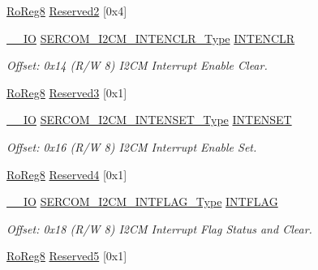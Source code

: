 \begin{DoxyCompactItemize}
\mbox{\hyperlink{group___s_a_m_d21_e15_a__definitions_ga0d957f1433aaf5d70e4dc2b68288442d}{Ro\+Reg8}} \mbox{\hyperlink{struct_sercom_i2cm_a78f3c89e13bd565a077e9418f43aaa04}{Reserved2}} \mbox{[}0x4\mbox{]}
\item 
\mbox{\hyperlink{core__cm0plus_8h_aec43007d9998a0a0e01faede4133d6be}{\+\_\+\+\_\+\+IO}} \mbox{\hyperlink{union_s_e_r_c_o_m___i2_c_m___i_n_t_e_n_c_l_r___type}{S\+E\+R\+C\+O\+M\+\_\+\+I2\+C\+M\+\_\+\+I\+N\+T\+E\+N\+C\+L\+R\+\_\+\+Type}} \mbox{\hyperlink{struct_sercom_i2cm_ada791d3665c1160b474eb29b5bd8f66d}{I\+N\+T\+E\+N\+C\+LR}}
\begin{DoxyCompactList}\small\item\em Offset\+: 0x14 (R/W 8) I2\+CM Interrupt Enable Clear. \end{DoxyCompactList}\item 
\mbox{\hyperlink{group___s_a_m_d21_e15_a__definitions_ga0d957f1433aaf5d70e4dc2b68288442d}{Ro\+Reg8}} \mbox{\hyperlink{struct_sercom_i2cm_ae12c3e940f27988a085afebe2f779a21}{Reserved3}} \mbox{[}0x1\mbox{]}
\item 
\mbox{\hyperlink{core__cm0plus_8h_aec43007d9998a0a0e01faede4133d6be}{\+\_\+\+\_\+\+IO}} \mbox{\hyperlink{union_s_e_r_c_o_m___i2_c_m___i_n_t_e_n_s_e_t___type}{S\+E\+R\+C\+O\+M\+\_\+\+I2\+C\+M\+\_\+\+I\+N\+T\+E\+N\+S\+E\+T\+\_\+\+Type}} \mbox{\hyperlink{struct_sercom_i2cm_a7ff0107c756828cd8350f89bd9debc87}{I\+N\+T\+E\+N\+S\+ET}}
\begin{DoxyCompactList}\small\item\em Offset\+: 0x16 (R/W 8) I2\+CM Interrupt Enable Set. \end{DoxyCompactList}\item 
\mbox{\hyperlink{group___s_a_m_d21_e15_a__definitions_ga0d957f1433aaf5d70e4dc2b68288442d}{Ro\+Reg8}} \mbox{\hyperlink{struct_sercom_i2cm_a5ca570382e961b7801aeafc161de2571}{Reserved4}} \mbox{[}0x1\mbox{]}
\item 
\mbox{\hyperlink{core__cm0plus_8h_aec43007d9998a0a0e01faede4133d6be}{\+\_\+\+\_\+\+IO}} \mbox{\hyperlink{union_s_e_r_c_o_m___i2_c_m___i_n_t_f_l_a_g___type}{S\+E\+R\+C\+O\+M\+\_\+\+I2\+C\+M\+\_\+\+I\+N\+T\+F\+L\+A\+G\+\_\+\+Type}} \mbox{\hyperlink{struct_sercom_i2cm_aaaa13d8df29742ec8b63c07fcc84e590}{I\+N\+T\+F\+L\+AG}}
\begin{DoxyCompactList}\small\item\em Offset\+: 0x18 (R/W 8) I2\+CM Interrupt Flag Status and Clear. \end{DoxyCompactList}\item 
\mbox{\hyperlink{group___s_a_m_d21_e15_a__definitions_ga0d957f1433aaf5d70e4dc2b68288442d}{Ro\+Reg8}} \mbox{\hyperlink{struct_sercom_i2cm_a7321f81c873f0c6c846004e246ac204d}{Reserved5}} \mbox{[}0x1\mbox{]}

\end{DoxyCompactItemize}
